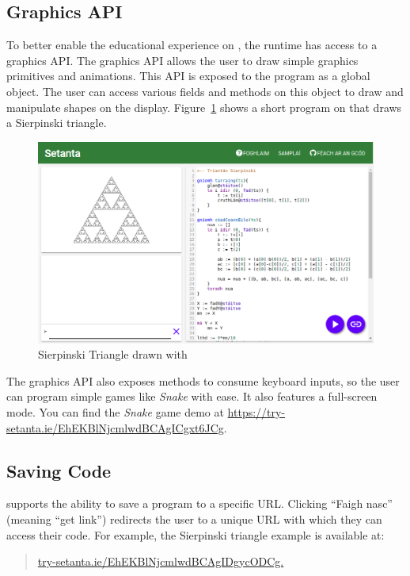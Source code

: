 \subsection{Graphics API}

To better enable the educational experience on \trys{}, the \Setanta{} runtime has access to a graphics API. The graphics API allows the user to draw simple graphics primitives and animations. This API is exposed to the \Setanta{} program as a global object. The user can access various fields and methods on this object to draw and manipulate shapes on the display. Figure~\ref{sierpinksitriangle} shows a short program on \trys{} that draws a Sierpinski triangle.

\begin{figure}[ht]
    \caption{Sierpinski Triangle drawn with \Setanta{}}
    \label{sierpinksitriangle}
    \begin{center}
    \includegraphics[scale=0.43]{sierpinskitriangle}
    \end{center}
\end{figure}

The graphics API also exposes methods to consume keyboard inputs, so the user can program simple games like \emph{Snake} with ease. It also features a full-screen mode. You can find the \emph{Snake} game demo at \url{https://try-setanta.ie/EhEKBlNjcmlwdBCAgICgxt6JCg}.

\subsection{Saving Code}

\trys{} supports the ability to save a program to a specific URL. Clicking ``Faigh nasc'' (meaning ``get link'') redirects the user to a unique URL with which they can access their code. For example, the Sierpinski triangle example is available at:
\begin{quote}
    \href{https://try-setanta.ie/EhEKBlNjcmlwdBCAgIDgycODCg}{try-setanta.ie/EhEKBlNjcmlwdBCAgIDgycODCg.}
\end{quote}

